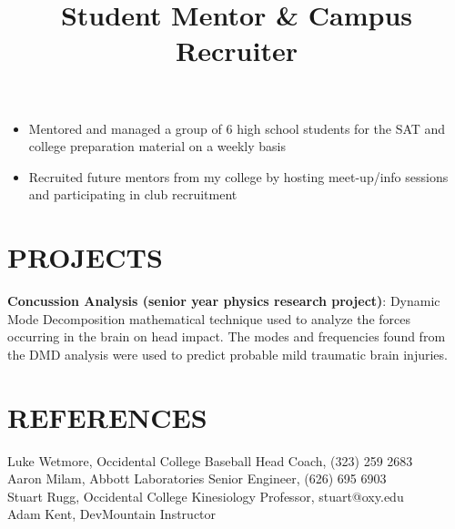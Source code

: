 \documentclass[margin]{res}
\begin{document}
\begin{resume}
\title{\textbf{Student Mentor \& Campus Recruiter}}
\begin{position}
    \begin{itemize}
        \item Mentored and managed a group of 6 high school students for the SAT and college preparation material on a weekly basis
        \item Recruited future mentors from my college by hosting meet-up/info sessions and participating in club recruitment
    \end{itemize}
\end{position}


\section{PROJECTS}
\par
\textbf{Concussion Analysis (senior year physics research project)}: 
Dynamic Mode Decomposition mathematical technique used to analyze the forces occurring in the brain on head impact. The modes and frequencies found from the DMD analysis were used to predict probable mild traumatic brain injuries.

\section{REFERENCES}
Luke Wetmore, Occidental College Baseball Head Coach, (323) 259 2683 \\
Aaron Milam, Abbott Laboratories Senior Engineer, (626) 695 6903 \\
Stuart Rugg, Occidental College Kinesiology Professor, stuart@oxy.edu\\
Adam Kent, DevMountain Instructor
\end{resume}
\end{document}
